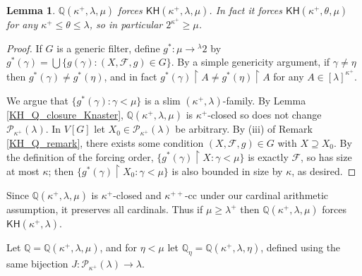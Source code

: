\documentclass[10pt,reqno]{amsart}
\theoremstyle{plain}
\newtheorem{lemma}[theorem]{Lemma}
\theoremstyle{definition}
\theoremstyle{remark}
\begin{document}
\begin{lemma}\label{KH_Q_effect}
$\mathbb{Q}(\kappa^+,\lambda,\mu)$ forces $\mathsf{KH}(\kappa^+,\lambda,\mu)$. In fact it forces $\mathsf{KH}(\kappa^+,\theta,\mu)$ for any $\kappa^+\leq\theta\leq\lambda$, so in particular $2^{\kappa^+}\geq\mu$.
\end{lemma}
\begin{proof}
If $G$ is a generic filter, define $g^*:\mu\rightarrow{}^{\lambda}2$ by $g^*(\gamma)=\bigcup\{g(\gamma):(X,\mathcal{F},g)\in G\}$. By a simple genericity argument, if $\gamma\neq\eta$ then $g^*(\gamma)\neq g^*(\eta)$, and in fact $g^*(\gamma)\upharpoonright A\neq g^*(\eta)\upharpoonright A$ for any $A\in[\lambda]^{\kappa^+}$.

We argue that $\{g^*(\gamma):\gamma<\mu\}$ is a slim $(\kappa^+,\lambda)$-family. By Lemma \ref{KH_Q_closure_Knaster}, $\mathbb{Q}(\kappa^+,\lambda,\mu)$ is $\kappa^+$-closed so does not change $\mathcal{P}_{\kappa^+}(\lambda)$. In $V[G]$ let $X_0\in\mathcal{P}_{\kappa^+}(\lambda)$ be arbitrary. By (iii) of Remark \ref{KH_Q_remark}, there exists some condition $(X,\mathcal{F},g)\in G$ with $X\supseteq X_0$. By the definition of the forcing order, $\{g^*(\gamma)\upharpoonright X:\gamma<\mu\}$ is exactly $\mathcal{F}$, so has size at most $\kappa$; then $\{g^*(\gamma)\upharpoonright X_0:\gamma<\mu\}$ is also bounded in size by $\kappa$, as desired.
\end{proof}

Since $\mathbb{Q}(\kappa^+,\lambda,\mu)$ is $\kappa^+$-closed and $\kappa^{++}$-cc under our cardinal arithmetic assumption, it preserves all cardinals. Thus if $\mu\geq\lambda^+$ then $\mathbb{Q}(\kappa^+,\lambda,\mu)$ forces $\mathsf{KH}(\kappa^+,\lambda)$.




Let $\mathbb{Q}=\mathbb{Q}(\kappa^+,\lambda,\mu)$, and for $\eta<\mu$ let $\mathbb{Q}_\eta=\mathbb{Q}(\kappa^+,\lambda,\eta)$, defined using the same bijection $J:\mathcal{P}_{\kappa^+}(\lambda)\rightarrow\lambda$.
\end{document}
